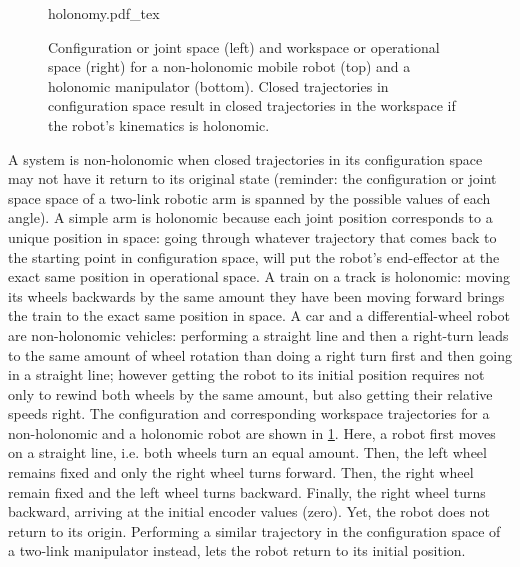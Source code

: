 \begin{figure}[!t]
    \small
    \centering
    \def\svgwidth{\textwidth}
    {holonomy.pdf_tex}
    \caption{Configuration or joint space (left) and workspace or operational space (right) for a non-holonomic mobile robot (top) and a holonomic manipulator (bottom). Closed trajectories in configuration space result in closed trajectories in the workspace if the robot's kinematics is holonomic.}
    \label{fig:holonomy}
\end{figure}

A system is non-holonomic when closed trajectories in its configuration space may not have it return to its original state (reminder: the configuration or joint space space of a two-link robotic arm is spanned by the possible values of each angle).
A simple arm is holonomic because each joint position corresponds to a unique position in space:
going through whatever trajectory that comes back to the starting point in configuration space, will put the robot's end-effector at the exact same position in operational space.
A train on a track is holonomic: moving its wheels backwards by the same amount they have been moving forward brings the train to the exact same position in space.
A car and a differential-wheel robot are non-holonomic vehicles: performing a straight line and then a right-turn leads to the same amount of wheel rotation than doing a right turn first and then going in a straight line; however getting the robot to its initial position requires not only to rewind both wheels by the same amount, but also getting their relative speeds right.
The configuration and corresponding workspace trajectories for a non-holonomic and a holonomic robot are shown in \cref{fig:holonomy}.
Here, a robot first moves on a straight line, i.e. both wheels turn an equal amount.
Then, the left wheel remains fixed and only the right wheel turns forward.
Then, the right wheel remain fixed and the left wheel turns backward.
Finally, the right wheel turns backward, arriving at the initial encoder values (zero).
Yet, the robot does not return to its origin. Performing a similar trajectory in the configuration space of a two-link manipulator instead, lets the robot return to its initial position.

